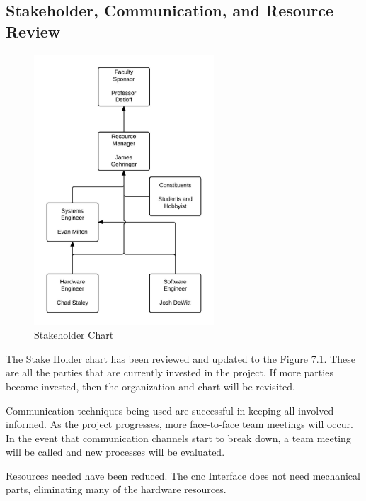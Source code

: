 \subsection{Stakeholder, Communication, and Resource Review}
\begin{figure}[H]
\centering
\includegraphics[width=0.6\textwidth]{shc.jpeg}
\caption{Stakeholder Chart}
\label{fig:Stakeholder Chart}
\end{figure}
The Stake Holder chart has been reviewed and updated to the Figure 7.1.
These are all the parties that are currently invested in the project. 
If more parties become invested, then the organization and chart will be revisited. 

Communication techniques being used are successful in keeping all involved informed.
As the project progresses, more face-to-face team meetings will occur.
In the event that communication channels start to break down, a team meeting will be called and new processes will be evaluated. 

Resources needed have been reduced. 
The \gls{cnc} Interface does not need mechanical parts, eliminating many of the hardware resources.

\pagebreak
